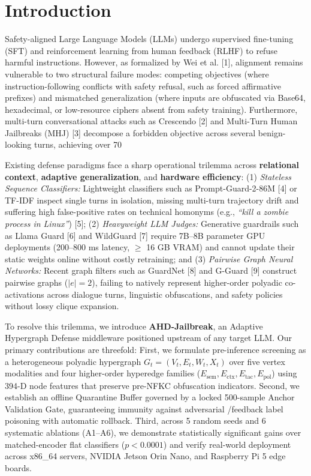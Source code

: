\documentclass[10pt,twocolumn]{article}
\begin{document}
\section{Introduction}
Safety-aligned Large Language Models (LLMs) undergo supervised fine-tuning (SFT) and reinforcement learning from human feedback (RLHF) to refuse harmful instructions. However, as formalized by Wei et al. [1], alignment remains vulnerable to two structural failure modes: competing objectives (where instruction-following conflicts with safety refusal, such as forced affirmative prefixes) and mismatched generalization (where inputs are obfuscated via Base64, hexadecimal, or low-resource ciphers absent from safety training). Furthermore, multi-turn conversational attacks such as Crescendo [2] and Multi-Turn Human Jailbreaks (MHJ) [3] decompose a forbidden objective across several benign-looking turns, achieving over 70%

Existing defense paradigms face a sharp operational trilemma across \textbf{relational context}, \textbf{adaptive generalization}, and \textbf{hardware efficiency}: (1) \textit{Stateless Sequence Classifiers:} Lightweight classifiers such as Prompt-Guard-2-86M [4] or TF-IDF inspect single turns in isolation, missing multi-turn trajectory drift and suffering high false-positive rates on technical homonyms (e.g., \emph{``kill a zombie process in Linux''}) [5]; (2) \textit{Heavyweight LLM Judges:} Generative guardrails such as Llama Guard [6] and WildGuard [7] require 7B--8B parameter GPU deployments (200--800 ms latency, $\ge$ 16 GB VRAM) and cannot update their static weights online without costly retraining; and (3) \textit{Pairwise Graph Neural Networks:} Recent graph filters such as GuardNet [8] and G-Guard [9] construct pairwise graphs ($|e|=2$), failing to natively represent higher-order polyadic co-activations across dialogue turns, linguistic obfuscations, and safety policies without lossy clique expansion.

To resolve this trilemma, we introduce \textbf{AHD-Jailbreak}, an Adaptive Hypergraph Defense middleware positioned upstream of any target LLM. Our primary contributions are threefold: First, we formulate pre-inference screening as a heterogeneous polyadic hypergraph $G_t = (V_t, E_t, W_t, X_t)$ over five vertex modalities and four higher-order hyperedge families ($E_{\text{sem}}, E_{\text{ctx}}, E_{\text{tac}}, E_{\text{pol}}$) using 394-D node features that preserve pre-NFKC obfuscation indicators. Second, we establish an offline Quarantine Buffer governed by a locked 500-sample Anchor Validation Gate, guaranteeing immunity against adversarial /feedback label poisoning with automatic rollback. Third, across 5 random seeds and 6 systematic ablations (A1--A6), we demonstrate statistically significant gains over matched-encoder flat classifiers ($p < 0.0001$) and verify real-world deployment across x86\_64 servers, NVIDIA Jetson Orin Nano, and Raspberry Pi 5 edge boards.
\end{document}
